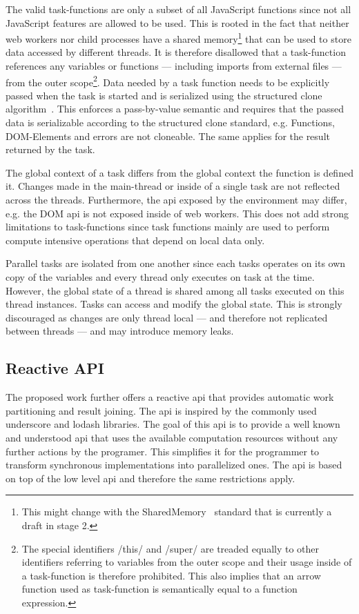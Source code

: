 The valid task-functions are only a subset of all JavaScript functions since not all JavaScript features are allowed to be used. This is rooted in the fact that neither web workers nor child processes have a shared memory\footnote{This might change with the SharedMemory~\cite{Ecma2016} standard that is currently a draft in stage 2.} that can be used to store data accessed by different threads. It is therefore disallowed that a task-function references any variables or functions --- including imports from external files --- from the outer scope\footnote{The special identifiers \javascriptinline/this/ and \javascriptinline/super/ are treaded equally to other identifiers referring to variables from the outer scope and their usage inside of a task-function is therefore prohibited. This also implies that an arrow function used as task-function is semantically equal to a function expression.}. Data needed by a task function needs to be explicitly passed when the task is started and is serialized using the structured clone algorithm~\cite[Section 2.9.4]{WHATWG2016}. This enforces a pass-by-value semantic and requires that the passed data is serializable according to the structured clone standard, e.g. Functions, DOM-Elements and errors are not cloneable. The same applies for the result returned by the task. 

The global context of a task differs from the global context the function is defined it. Changes made in the main-thread or inside of a single task are not reflected across the threads. Furthermore, the api exposed by the environment may differ, e.g. the DOM api is not exposed inside of web workers. This does not add strong limitations to task-functions since task functions mainly are used to perform compute intensive operations that depend on local data only.

Parallel tasks are isolated from one another since each tasks operates on its own copy of the variables and every thread only executes on task at the time. However, the global state of a thread is shared among all tasks executed on this thread instances. Tasks can access and modify the global state. This is strongly discouraged as changes are only thread local --- and therefore not replicated between threads --- and may introduce memory leaks. 

\subsection{Reactive API}
The proposed work further offers a reactive api that provides automatic work partitioning and result joining. The api is inspired by the commonly used underscore and lodash libraries. The goal of this api is to provide a well known and understood api that uses the available computation resources without any further actions by the programer. This simplifies it for the programmer to transform synchronous implementations into parallelized ones. The api is based on top of the low level api and therefore the same restrictions apply. 

